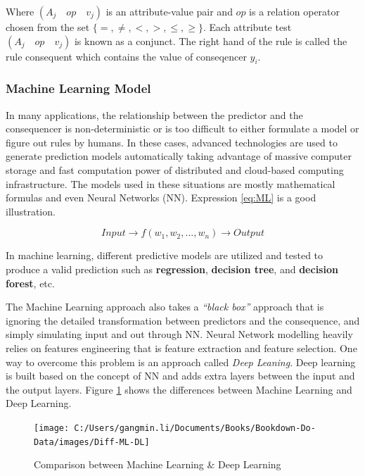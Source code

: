\documentclass[
]{book}
\begin{document}
Where \((A_j\quad op\quad v_j )\) is an attribute-value pair and \(op\) is a relation operator chosen from the set \(\{ =, ≠, <, >, ≤, ≥ \}\). Each attribute test \((A_j\quad op \quad v_j )\) is known as a conjunct. The right hand of the rule is called the rule consequent which contains the value of conseqencer \(y_i\).

\hypertarget{machine-learning-model}{%
\subsubsection*{Machine Learning Model}\label{machine-learning-model}}


In many applications, the relationship between the predictor and the consequencer is non-deterministic or is too difficult to either formulate a model or figure out rules by humans. In these cases, advanced technologies are used to generate prediction models automatically taking advantage of massive computer storage and fast computation power of distributed and cloud-based computing infrastructure. The models used in these situations are mostly mathematical formulas and even Neural Networks (NN). Expression \eqref{eq:ML} is a good illustration.

\begin{equation} 

Input → f(w_1,w_2, ...,w_n) → Output

\label{eq:ML}
\end{equation}

In machine learning, different predictive models are utilized and tested to produce a valid prediction such as \textbf{regression}, \textbf{decision tree}, and \textbf{decision forest}, etc.

The Machine Learning approach also takes a \emph{``black box''} approach that is ignoring the detailed transformation between predictors and the consequence, and simply simulating input and out through NN. Neural Network modelling heavily relies on features engineering that is feature extraction and feature selection. One way to overcome this problem is an approach called \emph{Deep Leaning}. Deep learning is built based on the concept of NN and adds extra layers between the input and the output layers. Figure \ref{fig:diff} shows the differences between Machine Learning and Deep Learning.

\begin{figure}

{\centering \texttt{[image: C:/Users/gangmin.li/Documents/Books/Bookdown-Do-Data/images/Diff-ML-DL]} 

}

\caption{Comparison between Machine Learning & Deep Learning}\label{fig:diff}
\end{figure}
\end{document}
